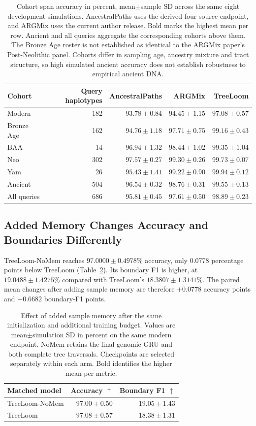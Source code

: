 \documentclass[letterpaper]{article}
\newcommand{\best}[1]{\mathbf{#1}}
\begin{document}
\begin{table}[t]
\centering
\small
\begin{tabular}{@{}lrrrr@{}}
\toprule
Cohort & Query haplotypes & AncestralPaths & ARGMix & TreeLoom\\
\midrule
Modern &182&$93.78\pm0.84$&$94.45\pm1.15$&$\best{97.08\pm0.57}$\\
Bronze Age &162&$94.76\pm1.18$&$97.71\pm0.75$&$\best{99.16\pm0.43}$\\
BAA &14&$96.94\pm1.32$&$98.44\pm1.02$&$\best{99.35\pm1.04}$\\
Neo &302&$97.57\pm0.27$&$99.30\pm0.26$&$\best{99.73\pm0.07}$\\
Yam &26&$95.43\pm1.41$&$99.22\pm0.90$&$\best{99.94\pm0.12}$\\
Ancient &504&$96.54\pm0.32$&$98.76\pm0.31$&$\best{99.55\pm0.13}$\\
All queries &686&$95.81\pm0.45$&$97.61\pm0.50$&$\best{98.89\pm0.23}$\\
\bottomrule
\end{tabular}
\caption{Cohort span accuracy in percent, mean$\pm$sample SD across the same eight development simulations. AncestralPaths uses the derived four source endpoint, and ARGMix uses the current author release. Bold marks the highest mean per row. Ancient and all queries aggregate the corresponding cohorts above them. The Bronze Age roster is not established as identical to the ARGMix paper's Post-Neolithic panel. Cohorts differ in sampling age, ancestry mixture and tract structure, so high simulated ancient accuracy does not establish robustness to empirical ancient DNA.}
\label{tab:cohorts}
\end{table}

\subsection{Added Memory Changes Accuracy and Boundaries Differently}
TreeLoom-NoMem reaches $97.0000\pm0.4978\%$ accuracy, only 0.0778 percentage points below TreeLoom (Table~\ref{tab:memory}). Its boundary F1 is higher, at $19.0488\pm1.4275\%$ compared with TreeLoom's $18.3807\pm1.3141\%$. The paired mean changes after adding sample memory are therefore $+0.0778$ accuracy points and $-0.6682$ boundary-F1 points.

\begin{table}[t]
\centering
\small
\begin{tabular}{@{}lrr@{}}
\toprule
Matched model & Accuracy $\uparrow$ & Boundary F1 $\uparrow$\\
\midrule
TreeLoom-NoMem &$97.00\pm0.50$&$\best{19.05\pm1.43}$\\
TreeLoom &$\best{97.08\pm0.57}$&$18.38\pm1.31$\\
\bottomrule
\end{tabular}
\caption{Effect of added sample memory after the same initialization and additional training budget. Values are mean$\pm$simulation SD in percent on the same modern endpoint. NoMem retains the final genomic GRU and both complete tree traversals. Checkpoints are selected separately within each arm. Bold identifies the higher mean per metric.}
\label{tab:memory}
\end{table}
\end{document}
